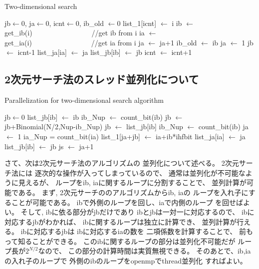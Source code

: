 \documentclass[prb,aps,showpacs,preprint,nofootinbib]{revtex4}
\newcommand{\lef}{\leftarrow}
\begin{document}
\begin{algorithm}                      
\caption{Two-dimensional search}         
\begin{algorithmic}                  
\STATE jb$\lef 0$, ja$\lef 0$, icnt$\lef 0$, ib\_old $\lef 0$
\STATE list\_1[icnt] $\lef$ i
\STATE ib $\lef$ get\_ib(i)~~~~~~~~~~~~~~~~~//get ib from i
\STATE ia $\lef$ get\_ia(i)~~~~~~~~~~~~~~~~~//get ia from i
  \STATE ja $\lef$ ja+1
  \ELSE
  \STATE ib\_old $\lef$ ib
  \STATE ja $\lef$ 1
  \STATE jb $\lef$ icnt-1
  \ENDIF
\STATE  list\_ja[ia] $\lef$ ja
\STATE  list\_jb[ib] $\lef$ jb
\STATE  icnt $\lef$ icnt+1
\ENDIF
\ENDFOR
\end{algorithmic}
\label{alg:2DSearch}
\end{algorithm}


\subsection{2次元サーチ法のスレッド並列化について}
\label{sec:thread}

\begin{algorithm}                      
\caption{Parallelization for two-dimensional search algorithm}         
\label{alg1}                          
\begin{algorithmic}                  
\STATE jb$\lef 0$
  \STATE list\_jb[ib] $\lef$ ib
  \STATE ib\_Nup $\lef$ count\_bit(ib)
  \STATE jb $\lef$ jb+Binomial(N/2,Nup-ib\_Nup)
\ENDFOR
{}
  \STATE jb $\lef$ list\_jb[ib]
  \STATE ib\_Nup $\lef$ count\_bit(ib)
  \STATE ja $\lef$ 1 
    \STATE ia\_Nup = count\_bit(ia)
      \STATE list\_1[ja+jb] $\lef$ ia+ib*ihfbit
      \STATE list\_ja[ia] $\lef$ ja
      \STATE list\_jb[ib] $\lef$ jb
      \STATE js $\lef$ ja+1
    \ENDIF
  \ENDFOR
\ENDFOR
\end{algorithmic}
\label{alg:P2DSearch}
\end{algorithm}

さて、次は2次元サーチ法のアルゴリズムの
並列化について述べる。
2次元サーチ法には
逐次的な操作が入ってしまっているので、
通常は並列化が不可能なように見えるが、
ループをib, iaに関するループに分割することで、
並列計算が可能である。
まず, 2次元サーチののアルゴリズムからib, iaの
ループを入れ子にすることが可能である。
ibで外側のループを回し、iaで内側のループ
を回せばよい。
そして, ibに依る部分がjbだけであり
ibとjbは一対一に対応するので、
ibに対応するjbがわかれば、
ibに関するループは独立に計算でき、
並列計算が行える。
ibに対応するjbは
ibに対応するiaの数を
二項係数を計算することで、
前もって知ることができる。
このibに関するループの部分は並列化不可能だが
ループ長が$2^{N/2}$なので、
この部分の計算時間は実質無視できる。
そのあとで、ib,iaの入れ子のループで
外側のibのループをopenmpでthread並列化
すればよい。
\end{document}
